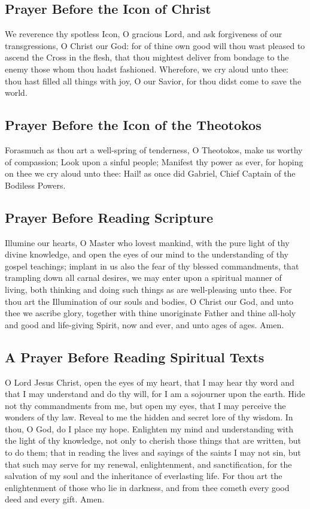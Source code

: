 \subsection{Prayer Before the Icon of Christ}

    We reverence thy spotless Icon, O gracious Lord, and ask forgiveness of our transgressions, O Christ our God: for of thine own good will thou wast pleased to ascend the Cross in the flesh, that thou mightest deliver from bondage to the enemy those whom thou hadst fashioned. Wherefore, we cry aloud unto thee: thou hast filled all things with joy, O our Savior, for thou didst come to save the world.

\subsection{Prayer Before the Icon of the Theotokos}

    Forasmuch as thou art a well-spring of tenderness, O Theotokos, make us worthy of compassion; Look upon a sinful people; Manifest thy power as ever, for hoping on thee we cry aloud unto thee: Hail! as once did Gabriel, Chief Captain of the Bodiless Powers.
    
\subsection{Prayer Before Reading Scripture}

Illumine our hearts, O Master who lovest mankind, with the pure light of thy divine knowledge, and open the eyes of our mind to the understanding of thy gospel teachings; implant in us also the fear of thy blessed commandments, that trampling down all carnal desires, we may enter upon a spiritual manner of living, both thinking and doing such things as are well-pleasing unto thee. For thou art the Illumination of our souls and bodies, O Christ our God, and unto thee we ascribe glory, together with thine unoriginate Father and thine all-holy and good and life-giving Spirit, now and ever, and unto ages of ages. Amen.

\subsection{A Prayer Before Reading Spiritual Texts}

O Lord Jesus Christ, open the eyes of my heart, that I may hear thy word and that I may understand and do thy will, for I am a sojourner upon the earth. Hide not thy commandments from me, but open my eyes, that I may perceive the wonders of thy law. Reveal to me the hidden and secret lore of thy wisdom. In thou, O God, do I place my hope. Enlighten my mind and understanding with the light of thy knowledge, not only to cherish those things that are written, but to do them; that in reading the lives and sayings of the saints I may not sin, but that such may serve for my renewal, enlightenment, and sanctification, for the salvation of my soul and the inheritance of everlasting life. For thou art the enlightenment of those who lie in darkness, and from thee cometh every good deed and every gift.
Amen.

